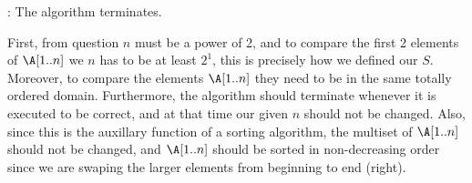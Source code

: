 \documentclass[11pt, sakura, night, 1in]{hw}
\begin{document}
\Termi: The algorithm terminates.

 First, from question $n$ must be a power of 2, and to compare the first 2 elements of $\A[1..n]$ we $n$ has to be at least $2^1$, this is precisely how we defined our $S$. Moreover, to compare the elements $\A[1..n]$ they need to be in the same totally ordered domain. Furthermore, the algorithm should terminate whenever it is executed to be correct, and at that time our given $n$ should not be changed. Also, since this is the auxillary function of a sorting algorithm, the multiset of $\A[1..n]$ should not be changed, and $\A[1..n]$ should be sorted in non-decreasing order since we are swaping the larger elements from beginning to end (right).

\begin{comment}
    
\newq{3}{
    Prove that \AUX\, satisfies the specifications in your answer to question 2.
}

\end{comment}
\end{document}
